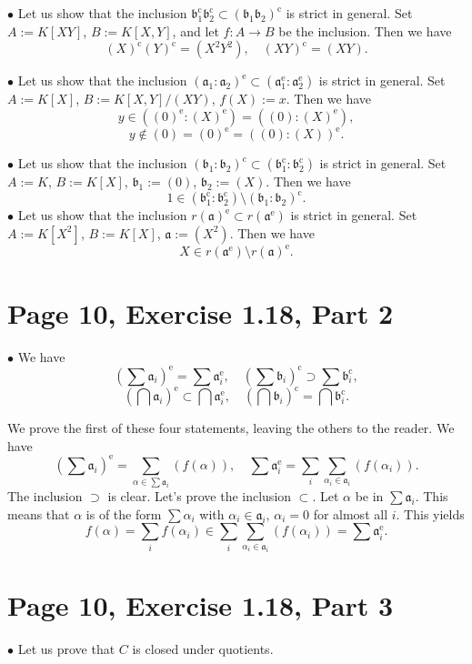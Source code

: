 \documentclass[12pt]{article}
\newcommand{\oo}{\operatorname}
\newcommand{\mf}{\mathfrak}
\newcommand{\bu}{\bullet}
\begin{document}
$\bu$ Let us show that the inclusion $\mf b_1^{\oo c}\mf b_2^{\oo c}\subset(\mf b_1\mf b_2)^{\oo c}$ is strict in general. Set $A:=K[XY]$, $B:=K[X,Y]$, and let $f:A\to B$ be the inclusion. Then we have 
$$
(X)^{\oo c}(Y)^{\oo c}=(X^2Y^2),\quad(XY)^{\oo c}=(XY).
$$

$\bu$ Let us show that the inclusion $(\mf a_1:\mf a_2)^{\oo e}\subset(\mf a_1^{\oo e}:\mf a_2^{\oo e})$ is strict in general. Set $A:=K[X]$, $B:=K[X,Y]/(XY)$, $f(X):=x$. Then we have 
$$
y\in((0)^{\oo e}:(X)^{\oo e})=((0):(X)^{\oo e}),
$$ 
$$y\notin(0)=(0)^{\oo e}=((0):(X))^{\oo e}.$$

$\bu$ Let us show that the inclusion $(\mf b_1:\mf b_2)^{\oo c}\subset(\mf b_1^{\oo c}:\mf b_2^{\oo c})$ is strict in general. Set $A:=K$, $B:=K[X]$, $\mf b_1:=(0)$, $\mf b_2:=(X)$. Then we have 
$$
1\in(\mf b_1^{\oo c}:\mf b_2^{\oo c})\setminus(\mf b_1:\mf b_2)^{\oo c}.
$$
$\bu$ Let us show that the inclusion $r(\mf a)^{\oo e}\subset r(\mf a^{\oo e})$ is strict in general. Set $A:=K[X^2]$, $B:=K[X]$, $\mf a:=(X^2)$. Then we have 
$$
X\in r(\mf a^{\oo e})\setminus r(\mf a)^{\oo e}.
$$

\section{Page 10, Exercise 1.18, Part 2}%

$\bu$ We have 
$$
\left(\sum\mf a_i\right)^{\oo e}=\sum\mf a_i^{\oo e},\quad\left(\sum\mf b_i\right)^{\oo c}\supset\sum\mf b_i^{\oo c},
$$
$$
\left(\bigcap\mf a_i\right)^{\oo e}\subset\bigcap\mf a_i^{\oo e},\quad\left(\bigcap\mf b_i\right)^{\oo c}=\bigcap\mf b_i^{\oo c}.
$$

We prove the first of these four statements, leaving the others to the reader. We have 
$$
\left(\sum\mf a_i\right)^{\oo e}=\sum_{\alpha\in\sum\mf a_i}(f(\alpha)),\quad\sum\mf a_i^{\oo e}=\sum_i\sum_{\alpha_i\in\mf a_i}(f(\alpha_i)).
$$ 
The inclusion $\supset$ is clear. Let's prove the inclusion $\subset$. Let $\alpha$ be in $\sum\mf a_i$. This means that $\alpha$ is of the form $\sum\alpha_i$ with $\alpha_i\in\mf a_i$, $\alpha_i=0$ for almost all $i$. This yields 
$$
f(\alpha)=\sum_if(\alpha_i)\in\sum_i\sum_{\alpha_i\in\mf a_i}(f(\alpha_i))=\sum\mf a_i^{\oo e}.
$$ 

\section{Page 10, Exercise 1.18, Part 3}%

$\bu$ Let us prove that $C$ is closed under quotients. 
\end{document}
